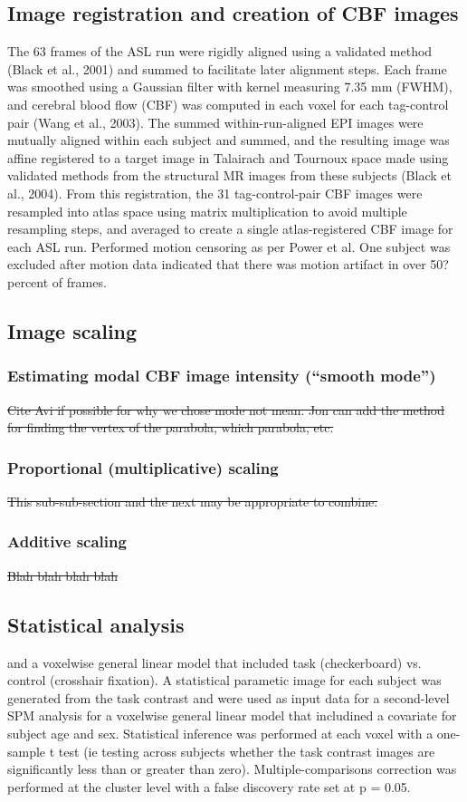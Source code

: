 \subsection{Image registration and creation of CBF images}
The 63 frames of the ASL run were rigidly aligned using a validated method (Black et al., 2001) and summed to facilitate later alignment steps. Each frame was smoothed using a Gaussian filter with kernel measuring 7.35 mm (FWHM), and cerebral blood flow (CBF) was computed in each voxel for each tag-control pair (Wang et al., 2003). The summed within-run-aligned EPI images were mutually aligned within each subject and summed, and the resulting image was affine registered to a target image in Talairach and Tournoux space made using validated methods from the structural MR images from these subjects (Black et al., 2004). From this registration, the 31 tag-control-pair CBF images were resampled into atlas space using matrix multiplication to avoid multiple resampling steps, and averaged to create a single atlas-registered CBF image for each ASL run. 
Performed motion censoring as per Power et al. One subject was excluded after motion data indicated that there was motion artifact in over 50? percent of frames.

\subsection{Image scaling}
\subsubsection{Estimating modal CBF image intensity (``smooth mode'')}
\sout{Cite Avi if possible for why we chose mode not mean. Jon can add the method for finding the vertex of the parabola, which parabola, etc.} 
\subsubsection{Proportional (multiplicative) scaling}
\sout{This sub-sub-section and the next may be appropriate to combine.}
\subsubsection{Additive scaling}
\sout{Blah blah blah blah}

\subsection{Statistical analysis}
 and a voxelwise general linear model that included task (checkerboard) vs. control (crosshair fixation). A statistical parametic image for each subject was generated from the task contrast and were used as input data for a second-level SPM analysis for a voxelwise general linear model that includined a covariate for subject age and sex. Statistical inference was performed at each voxel with a one-sample t test (ie testing across subjects whether the task contrast images are significantly less than or greater than zero). 
Multiple-comparisons correction was performed at the cluster level with a false discovery rate set at p = 0.05. 


